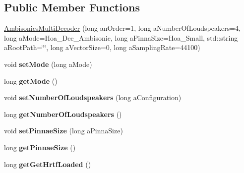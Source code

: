 \subsection*{Public Member Functions}
\begin{DoxyCompactItemize}
\item 
\hyperlink{class_ambisonics_multi_decoder_aa1f1f419fc8b8d032e562009ccb2e6bc}{Ambisonics\-Multi\-Decoder} (long an\-Order=1, long a\-Number\-Of\-Loudspeakers=4, long a\-Mode=Hoa\-\_\-\-Dec\-\_\-\-Ambisonic, long a\-Pinna\-Size=Hoa\-\_\-\-Small, std\-::string a\-Root\-Path=\char`\"{}\char`\"{}, long a\-Vector\-Size=0, long a\-Sampling\-Rate=44100)
\item 
\hypertarget{class_ambisonics_multi_decoder_ab9c59f6f63491eee442262321a55b865}{void {\bfseries set\-Mode} (long a\-Mode)}\label{class_ambisonics_multi_decoder_ab9c59f6f63491eee442262321a55b865}

\item 
\hypertarget{class_ambisonics_multi_decoder_a19478178276f6f3cbdfd03b517ce9061}{long {\bfseries get\-Mode} ()}\label{class_ambisonics_multi_decoder_a19478178276f6f3cbdfd03b517ce9061}

\item 
\hypertarget{class_ambisonics_multi_decoder_a81f2db6b031852a3b854d474b5003772}{void {\bfseries set\-Number\-Of\-Loudspeakers} (long a\-Configuration)}\label{class_ambisonics_multi_decoder_a81f2db6b031852a3b854d474b5003772}

\item 
\hypertarget{class_ambisonics_multi_decoder_a7e3bb36754e9ba91876ae8266eef14ab}{long {\bfseries get\-Number\-Of\-Loudspeakers} ()}\label{class_ambisonics_multi_decoder_a7e3bb36754e9ba91876ae8266eef14ab}

\item 
\hypertarget{class_ambisonics_multi_decoder_a31398c1333e0734e65afdc2d231d67d3}{void {\bfseries set\-Pinnae\-Size} (long a\-Pinna\-Size)}\label{class_ambisonics_multi_decoder_a31398c1333e0734e65afdc2d231d67d3}

\item 
\hypertarget{class_ambisonics_multi_decoder_a3d1fdbbeca7f11d681fa1e7e392cc1f5}{long {\bfseries get\-Pinnae\-Size} ()}\label{class_ambisonics_multi_decoder_a3d1fdbbeca7f11d681fa1e7e392cc1f5}

\item 
\hypertarget{class_ambisonics_multi_decoder_ab80ba28e0407bae42cf6f31f71c20022}{long {\bfseries get\-Get\-Hrtf\-Loaded} ()}\label{class_ambisonics_multi_decoder_ab80ba28e0407bae42cf6f31f71c20022}


\end{DoxyCompactItemize}
